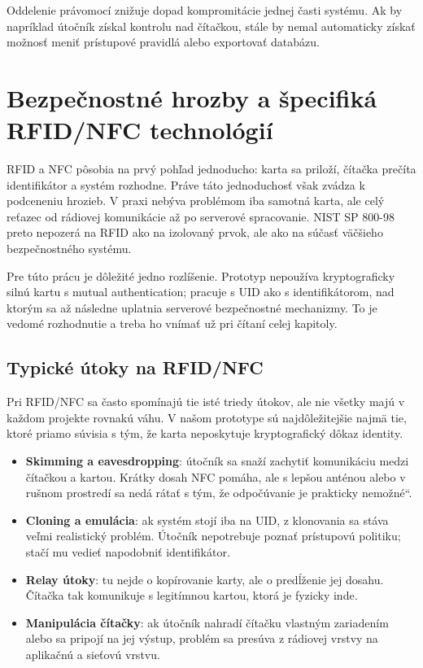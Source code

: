 \documentclass[journal,a4paper,onecolumn]{IEEEtran}
\newcommand{\uv}[1]{\quotedblbase#1\textquotedblleft}
\begin{document}
Oddelenie právomocí znižuje dopad kompromitácie jednej časti systému. Ak by napríklad útočník získal kontrolu nad čítačkou, stále by nemal automaticky získať možnosť meniť prístupové pravidlá alebo exportovať databázu.



\section{Bezpečnostné hrozby a špecifiká RFID/NFC technológií}

RFID a NFC pôsobia na prvý pohľad jednoducho: karta sa priloží, čítačka prečíta identifikátor a systém rozhodne. Práve táto jednoduchosť však zvádza k podceneniu hrozieb. V praxi nebýva problémom iba samotná karta, ale celý reťazec od rádiovej komunikácie až po serverové spracovanie. NIST SP 800-98 preto nepozerá na RFID ako na izolovaný prvok, ale ako na súčasť väčšieho bezpečnostného systému\cite{NIST80098}.

Pre túto prácu je dôležité jedno rozlíšenie. Prototyp nepoužíva kryptograficky silnú kartu s mutual authentication; pracuje s UID ako s identifikátorom, nad ktorým sa až následne uplatnia serverové bezpečnostné mechanizmy. To je vedomé rozhodnutie a treba ho vnímať už pri čítaní celej kapitoly.

\subsection{Typické útoky na RFID/NFC}

Pri RFID/NFC sa často spomínajú tie isté triedy útokov, ale nie všetky majú v každom projekte rovnakú váhu. V našom prototype sú najdôležitejšie najmä tie, ktoré priamo súvisia s tým, že karta neposkytuje kryptografický dôkaz identity.

\begin{itemize}[leftmargin=*,itemsep=2pt]
  \item \textbf{Skimming a eavesdropping}: útočník sa snaží zachytiť komunikáciu medzi čítačkou a kartou. Krátky dosah NFC pomáha, ale s lepšou anténou alebo v rušnom prostredí sa nedá rátať s tým, že odpočúvanie je \uv{prakticky nemožné}.
  \item \textbf{Cloning a emulácia}: ak systém stojí iba na UID, z klonovania sa stáva veľmi realistický problém. Útočník nepotrebuje poznať prístupovú politiku; stačí mu vedieť napodobniť identifikátor.
  \item \textbf{Relay útoky}: tu nejde o kopírovanie karty, ale o predĺženie jej dosahu. Čítačka tak komunikuje s legitímnou kartou, ktorá je fyzicky inde.
  \item \textbf{Manipulácia čítačky}: ak útočník nahradí čítačku vlastným zariadením alebo sa pripojí na jej výstup, problém sa presúva z rádiovej vrstvy na aplikačnú a sieťovú vrstvu.
\end{itemize}
\end{document}
